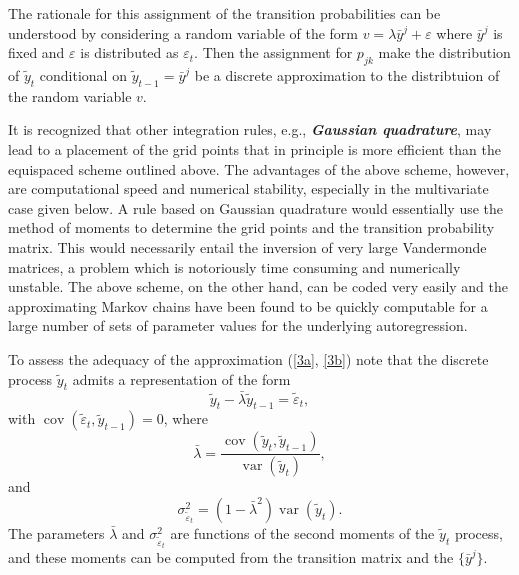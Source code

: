\documentclass[12pt]{article}
\theoremstyle{definition}
\begin{document}
The rationale for this assignment of the transition probabilities can be understood by considering a random variable of the form $v = \lambda \bar{y}^j + \varepsilon$ where $\bar{y}^j $ is fixed and $\varepsilon$ is distributed as $\varepsilon_t$. Then the assignment for $p_{jk}$ make the distribution of $\tilde{y}_t$ conditional on $\tilde{y}_{t-1} = \bar{y}^j$ be a discrete approximation to the distribtuion of the random variable $v$. 

It is recognized that other integration rules, e.g., \emph{\bf Gaussian quadrature}, may lead to a placement of the grid points that in principle is more efficient than the equispaced scheme outlined above. The advantages of the above scheme, however, are computational speed and numerical stability, especially in the multivariate case given below. A rule based on Gaussian quadrature would essentially use the method of moments to determine the grid points and the transition probability matrix. This would necessarily entail the inversion of very large Vandermonde matrices, a problem which is notoriously time consuming and numerically unstable. The above scheme, on the other hand, can be coded very easily and the approximating Markov chains have been found to be quickly computable for a large number of sets of parameter values for the underlying autoregression. 

To assess the adequacy of the approximation (\ref{3a}, \ref{3b}) note that the discrete process $\tilde{y}_t$ admits a representation of the form $$\tilde{y}_t - \bar{\lambda} \tilde{y}_{t-1} = \tilde{\varepsilon}_t,$$ with $\operatorname{cov}(\tilde{\varepsilon}_t, \tilde{y}_{t-1}) = 0$, where $$\bar{\lambda} = \frac{\operatorname{cov}(\tilde{y}_{t}, \tilde{y}_{t-1})}{\operatorname{var}(\tilde{y}_{t})},$$ and $$\sigma_{\tilde{\varepsilon}_t}^2 = (1 -\bar{\lambda}^2 )\operatorname{var}(\tilde{y}_{t}).$$ The parameters $\bar{\lambda}$ and $\sigma_{\tilde{\varepsilon}_t}^2$ are functions of the second moments of the $\tilde{y}_t$ process, and these moments can be computed from the transition matrix and the $\{\bar{y}^j\}$.
\end{document}
